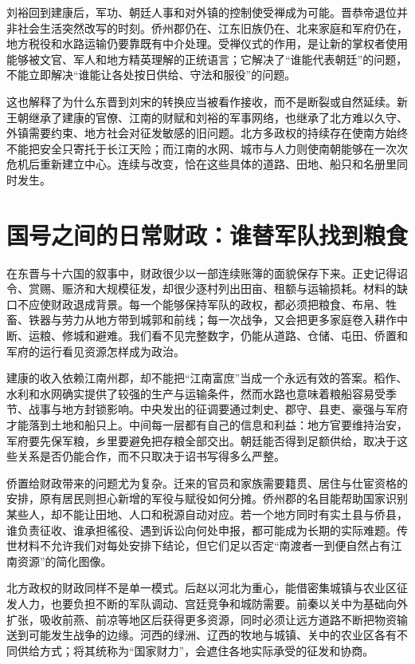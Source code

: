 刘裕回到建康后，军功、朝廷人事和对外镇的控制使受禅成为可能。晋恭帝退位并非社会生活突然改写的时刻。侨州郡仍在、江东旧族仍在、北来家庭和军府仍在，地方税役和水路运输仍要靠既有中介处理。受禅仪式的作用，是让新的掌权者使用能够被文官、军人和地方精英理解的正统语言；它解决了“谁能代表朝廷”的问题，不能立即解决“谁能让各处按日供给、守法和服役”的问题。

这也解释了为什么东晋到刘宋的转换应当被看作接收，而不是断裂或自然延续。新王朝继承了建康的官僚、江南的财赋和刘裕的军事网络，也继承了北方难以久守、外镇需要约束、地方社会对征发敏感的旧问题。北方多政权的持续存在使南方始终不能把安全只寄托于长江天险；而江南的水网、城市与人力则使南朝能够在一次次危机后重新建立中心。连续与改变，恰在这些具体的道路、田地、船只和名册里同时发生。

\section{国号之间的日常财政：谁替军队找到粮食}
\label{sec:eastern-jin-depth-fiscal-local}

在东晋与十六国的叙事中，财政很少以一部连续账簿的面貌保存下来。正史记得诏令、赏赐、赈济和大规模征发，却很少逐村列出田亩、租额与运输损耗。材料的缺口不应使财政退成背景。每一个能够保持军队的政权，都必须把粮食、布帛、牲畜、铁器与劳力从地方带到城郭和前线；每一次战争，又会把更多家庭卷入耕作中断、运粮、修城和避难。我们看不见完整数字，仍能从道路、仓储、屯田、侨置和军府的运行看见资源怎样成为政治。

建康的收入依赖江南州郡，却不能把“江南富庶”当成一个永远有效的答案。稻作、水利和水网确实提供了较强的生产与运输条件，然而水路也意味着粮船容易受季节、战事与地方封锁影响。中央发出的征调要通过刺史、郡守、县吏、豪强与军府才能落到土地和船只上。中间每一层都有自己的信息和利益：地方官要维持治安，军府要先保军粮，乡里要避免把存粮全部交出。朝廷能否得到足额供给，取决于这些关系是否仍能合作，而不只取决于诏书写得多么严整。

侨置给财政带来的问题尤为复杂。迁来的官员和家族需要籍贯、居住与仕宦资格的安排，原有居民则担心新增的军役与赋役如何分摊。侨州郡的名目能帮助国家识别某些人，却不能让田地、人口和税源自动对应。若一个地方同时有实土县与侨县，谁负责征收、谁承担徭役、遇到诉讼向何处申报，都可能成为长期的实际难题。传世材料不允许我们对每处安排下结论，但它们足以否定“南渡者一到便自然占有江南资源”的简化图像。

北方政权的财政同样不是单一模式。后赵以河北为重心，能借密集城镇与农业区征发人力，也要负担不断的军队调动、宫廷竞争和城防需要。前秦以关中为基础向外扩张，吸收前燕、前凉等地区后获得更多资源，同时必须让远方道路不断把物资输送到可能发生战争的边缘。河西的绿洲、辽西的牧地与城镇、关中的农业区各有不同供给方式；将其统称为“国家财力”，会遮住各地实际承受的征发和协商。

